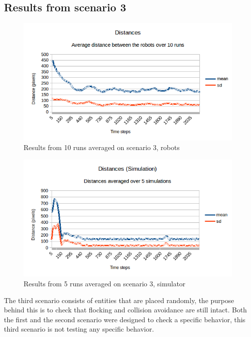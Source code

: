 \subsection{Results from scenario 3}
\label{sec:res3}
\begin{figure}[h]
\begin{center}
\includegraphics[width=0.8\linewidth]{figs/runs/3pdist}
\end{center}
\caption[3. Distances, robots]{Results from 10 runs averaged on scenario 3, robots}
\label{fig:res3pdist}
\end{figure}
\begin{figure}[h]
\begin{center}
\includegraphics[width=0.8\linewidth]{figs/runs/3sdist}
\end{center}
\caption[3. Distances, simulation]{Results from 5 runs averaged on scenario 3, simulator}
\label{fig:res3sdist}
\end{figure}
The third scenario consists of entities that are placed randomly, the purpose behind this is to check that flocking and collision avoidance are still intact. Both the first and the second scenario were designed to check a specific behavior, this third scenario is not testing any specific behavior.

